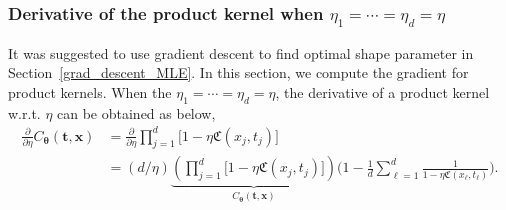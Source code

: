 \documentclass{svjour3}                     %
\newcommand{\bm}[1]{\boldsymbol{#1}}
\newcommand{\vtheta}{{\bm{\theta}}}
\newcommand{\vt}{\bm{t}}
\newcommand{\vx}{\bm{x}}
\newcommand\secref{Section~\ref}
\begin{document}
\subsubsection{Derivative of the product kernel when $\eta_1=\cdots=\eta_d=\eta$}
\label{sec:deriv_of_kernel}
It was suggested to use gradient descent to find optimal shape parameter in \secref{grad_descent_MLE}. In this section, we compute the gradient for product kernels. When the $\eta_1=\cdots=\eta_d=\eta$, the derivative of a product kernel  w.r.t. $\eta$ can be obtained as below,
\begin{align*}
\frac{\partial}{\partial \eta} C_\vtheta(\vt, \vx) 
& =
\frac{\partial}{\partial \eta} 
\prod_{j=1}^d \biggl[
1 - \eta \mathfrak{C}(x_j,t_j) \biggr] %
\\
& =
({d}/{\eta} )
\underbrace{
	\left(
	\prod_{j=1}^d \biggl[
	1 - \eta \mathfrak{C}(x_j,t_j) \biggr]
	\right) }_
{ C_\vtheta(\vt, \vx) }
\biggl(
1 - 
\frac{1}{d} \sum_{\ell=1}^d
\frac{1}
{ 1 - \eta \mathfrak{C}(x_\ell,t_\ell) }
\biggr)
.
\end{align*}

\end{document}
